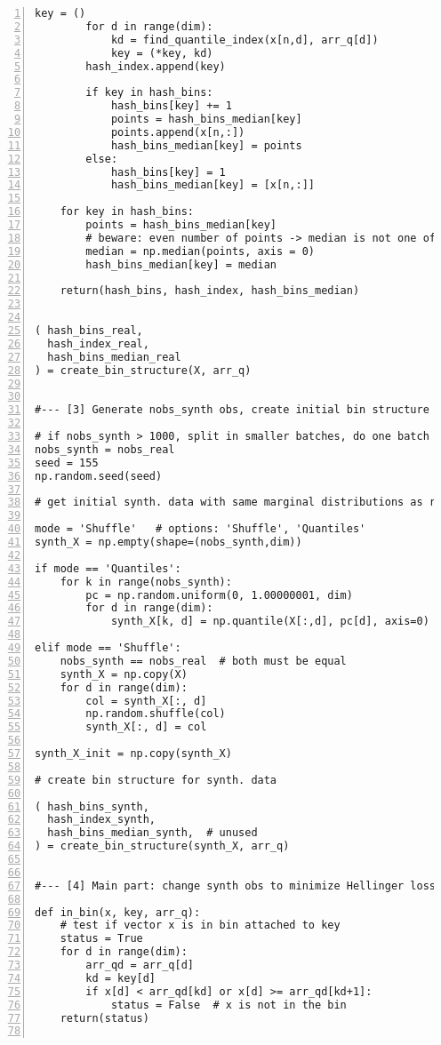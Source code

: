 \documentclass[oneside,10pt]{book}
\begin{document}
\begin{lstlisting}[numbers=left]
        key = ()
        for d in range(dim):
            kd = find_quantile_index(x[n,d], arr_q[d])
            key = (*key, kd)        
        hash_index.append(key)

        if key in hash_bins: 
            hash_bins[key] += 1
            points = hash_bins_median[key]
            points.append(x[n,:])
            hash_bins_median[key] = points 
        else:
            hash_bins[key] = 1
            hash_bins_median[key] = [x[n,:]]  

    for key in hash_bins: 
        points = hash_bins_median[key]
        # beware: even number of points -> median is not one of the points  
        median = np.median(points, axis = 0) 
        hash_bins_median[key] = median

    return(hash_bins, hash_index, hash_bins_median)


( hash_bins_real, 
  hash_index_real, 
  hash_bins_median_real
) = create_bin_structure(X, arr_q)


#--- [3] Generate nobs_synth obs, create initial bin structure for synth data  

# if nobs_synth > 1000, split in smaller batches, do one batch at a time
nobs_synth = nobs_real 
seed = 155
np.random.seed(seed)

# get initial synth. data with same marginal distributions as real data 

mode = 'Shuffle'   # options: 'Shuffle', 'Quantiles' 
synth_X = np.empty(shape=(nobs_synth,dim))

if mode == 'Quantiles':
    for k in range(nobs_synth):
        pc = np.random.uniform(0, 1.00000001, dim)
        for d in range(dim):
            synth_X[k, d] = np.quantile(X[:,d], pc[d], axis=0)

elif mode == 'Shuffle':
    nobs_synth == nobs_real  # both must be equal
    synth_X = np.copy(X)
    for d in range(dim):
        col = synth_X[:, d]
        np.random.shuffle(col)
        synth_X[:, d] = col

synth_X_init = np.copy(synth_X)

# create bin structure for synth. data

( hash_bins_synth, 
  hash_index_synth,
  hash_bins_median_synth,  # unused
) = create_bin_structure(synth_X, arr_q)


#--- [4] Main part: change synth obs to minimize Hellinger loss function

def in_bin(x, key, arr_q):
    # test if vector x is in bin attached to key
    status = True
    for d in range(dim):
        arr_qd = arr_q[d]
        kd = key[d]
        if x[d] < arr_qd[kd] or x[d] >= arr_qd[kd+1]:
            status = False  # x is not in the bin
    return(status) 


\end{lstlisting}
\end{document}
